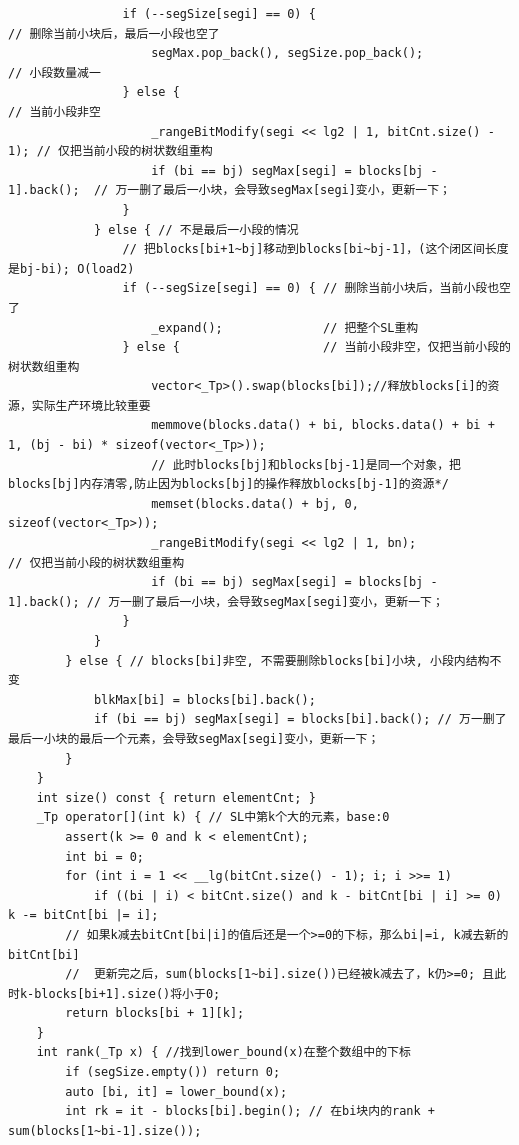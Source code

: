 \documentclass[UTF8,twoside]{ctexart}
\begin{document}
\begin{lstlisting}
                if (--segSize[segi] == 0) {                              // 删除当前小块后，最后一小段也空了
                    segMax.pop_back(), segSize.pop_back();               // 小段数量减一
                } else {                                                 // 当前小段非空
                    _rangeBitModify(segi << lg2 | 1, bitCnt.size() - 1); // 仅把当前小段的树状数组重构
                    if (bi == bj) segMax[segi] = blocks[bj - 1].back();  // 万一删了最后一小块，会导致segMax[segi]变小，更新一下；
                }
            } else { // 不是最后一小段的情况
                // 把blocks[bi+1~bj]移动到blocks[bi~bj-1]，(这个闭区间长度是bj-bi); O(load2)
                if (--segSize[segi] == 0) { // 删除当前小块后，当前小段也空了
                    _expand();              // 把整个SL重构
                } else {                    // 当前小段非空，仅把当前小段的树状数组重构
                    vector<_Tp>().swap(blocks[bi]);//释放blocks[i]的资源，实际生产环境比较重要
                    memmove(blocks.data() + bi, blocks.data() + bi + 1, (bj - bi) * sizeof(vector<_Tp>));
                    // 此时blocks[bj]和blocks[bj-1]是同一个对象，把blocks[bj]内存清零,防止因为blocks[bj]的操作释放blocks[bj-1]的资源*/
                    memset(blocks.data() + bj, 0, sizeof(vector<_Tp>));
                    _rangeBitModify(segi << lg2 | 1, bn);               // 仅把当前小段的树状数组重构
                    if (bi == bj) segMax[segi] = blocks[bj - 1].back(); // 万一删了最后一小块，会导致segMax[segi]变小，更新一下；
                }
            }
        } else { // blocks[bi]非空, 不需要删除blocks[bi]小块, 小段内结构不变
            blkMax[bi] = blocks[bi].back();
            if (bi == bj) segMax[segi] = blocks[bi].back(); // 万一删了最后一小块的最后一个元素，会导致segMax[segi]变小，更新一下；
        }
    }
    int size() const { return elementCnt; }
    _Tp operator[](int k) { // SL中第k个大的元素，base:0
        assert(k >= 0 and k < elementCnt);
        int bi = 0;
        for (int i = 1 << __lg(bitCnt.size() - 1); i; i >>= 1)
            if ((bi | i) < bitCnt.size() and k - bitCnt[bi | i] >= 0) k -= bitCnt[bi |= i];
        // 如果k减去bitCnt[bi|i]的值后还是一个>=0的下标，那么bi|=i, k减去新的bitCnt[bi]
        //  更新完之后，sum(blocks[1~bi].size())已经被k减去了，k仍>=0; 且此时k-blocks[bi+1].size()将小于0;
        return blocks[bi + 1][k];
    }
    int rank(_Tp x) { //找到lower_bound(x)在整个数组中的下标
        if (segSize.empty()) return 0;
        auto [bi, it] = lower_bound(x);
        int rk = it - blocks[bi].begin(); // 在bi块内的rank + sum(blocks[1~bi-1].size());

\end{lstlisting}
\end{document}
